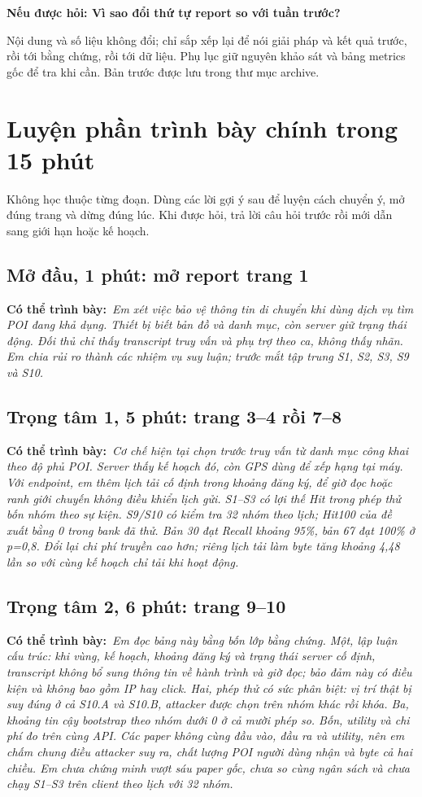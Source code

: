 \documentclass[10pt,a4paper]{article}
\newcommand{\say}[1]{\par\textbf{Có thể trình bày:}\ \textit{#1}\par}
\newcommand{\ask}[2]{\par\textbf{Nếu được hỏi: #1}\par #2\par}
\newcommand{\guidepage}[1]{\clearpage\section{#1}}
\begin{document}
\ask{Vì sao đổi thứ tự report so với tuần trước?}{Nội dung và số liệu không đổi; chỉ sắp xếp lại để nói giải pháp và kết quả trước, rồi tới bằng chứng, rồi tới dữ liệu. Phụ lục giữ nguyên khảo sát và bảng metrics gốc để tra khi cần. Bản trước được lưu trong thư mục archive.}

\guidepage{Luyện phần trình bày chính trong 15 phút}
Không học thuộc từng đoạn. Dùng các lời gợi ý sau để luyện cách chuyển ý, mở đúng trang và dừng đúng lúc. Khi được hỏi, trả lời câu hỏi trước rồi mới dẫn sang giới hạn hoặc kế hoạch.

\subsection*{Mở đầu, 1 phút: mở report trang 1}
\say{Em xét việc bảo vệ thông tin di chuyển khi dùng dịch vụ tìm POI đang khả dụng. Thiết bị biết bản đồ và danh mục, còn server giữ trạng thái động. Đối thủ chỉ thấy transcript truy vấn và phụ trợ theo ca, không thấy nhãn. Em chia rủi ro thành các nhiệm vụ suy luận; trước mắt tập trung S1, S2, S3, S9 và S10.}

\subsection*{Trọng tâm 1, 5 phút: trang 3--4 rồi 7--8}
\say{Cơ chế hiện tại chọn trước truy vấn từ danh mục công khai theo độ phủ POI. Server thấy kế hoạch đó, còn GPS dùng để xếp hạng tại máy. Với endpoint, em thêm lịch tải cố định trong khoảng đăng ký, để giờ đọc hoặc ranh giới chuyến không điều khiển lịch gửi. S1--S3 có lợi thế Hit trong phép thử bốn nhóm theo sự kiện. S9/S10 có kiểm tra 32 nhóm theo lịch; Hit100 của đề xuất bằng 0 trong bank đã thử. Bản 30 đạt Recall khoảng 95\%, bản 67 đạt 100\% ở p=0,8. Đổi lại chi phí truyền cao hơn; riêng lịch tải làm byte tăng khoảng 4,48 lần so với cùng kế hoạch chỉ tải khi hoạt động.}

\subsection*{Trọng tâm 2, 6 phút: trang 9--10}
\say{Em đọc bảng này bằng bốn lớp bằng chứng. Một, lập luận cấu trúc: khi vùng, kế hoạch, khoảng đăng ký và trạng thái server cố định, transcript không bổ sung thông tin về hành trình và giờ đọc; bảo đảm này có điều kiện và không bao gồm IP hay click. Hai, phép thử có sức phân biệt: vị trí thật bị suy đúng ở cả S10.A và S10.B, attacker được chọn trên nhóm khác rồi khóa. Ba, khoảng tin cậy bootstrap theo nhóm dưới 0 ở cả mười phép so. Bốn, utility và chi phí đo trên cùng API. Các paper không cùng đầu vào, đầu ra và utility, nên em chấm chung điều attacker suy ra, chất lượng POI người dùng nhận và byte cả hai chiều. Em chưa chứng minh vượt sáu paper gốc, chưa so cùng ngân sách và chưa chạy S1--S3 trên client theo lịch với 32 nhóm.}
\end{document}

